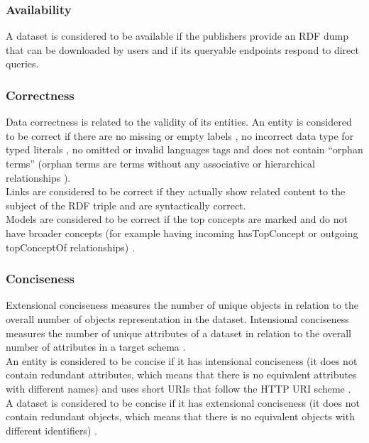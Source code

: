 \documentclass[onecolumn, crcready]{iosart2c}
\begin{document}
\subsubsection{Availability}

A dataset is considered to be available if the publishers provide an RDF dump that can be downloaded by users \cite{flemming2010}\cite{Hogan2010} and if its queryable endpoints respond to direct queries.

\subsubsection{Correctness}

Data correctness is related to the validity of its entities. An entity is considered to be correct if there are no missing or empty labels \cite{Acosta2013}\cite{Mader2012}, no incorrect data type for typed literals \cite{Hogan2010}\cite{Acosta2013}, no omitted or invalid languages tags \cite{Suominen:2012:IQS:2413941.2413985}\cite{Mader2012} and does not contain ``orphan terms'' (orphan terms are terms without any associative or hierarchical relationships \cite{journals/ires/Living10}).\\ Links are considered to be correct if they actually show related content to the subject of the RDF triple \cite{Suominen:2012:IQS:2413941.2413985}\cite{Acosta2013} and are syntactically correct. \\ Models are considered to be correct if the top concepts are marked and do not have broader concepts (for example having incoming hasTopConcept or outgoing topConceptOf relationships) \cite{Mader2012}.

\subsubsection{Conciseness}

Extensional conciseness measures the number of unique objects in relation to the overall number of objects representation in the dataset. Intensional conciseness measures the number of unique attributes of a dataset in relation to the overall number of attributes in a target schema \cite{ Bleiholder:2009}. \\ An entity is considered to be concise if it has intensional conciseness (it does not contain redundant attributes, which means that there is no equivalent attributes with different names) \cite{Mendes2012} and uses short URIs \cite{Framework2012} that follow the HTTP URI scheme \cite{Hogan:2012:ESL:2263498.2264570}\cite{Suominen2013}.\\ A dataset is considered to be concise if it has extensional conciseness (it does not contain redundant objects, which means that there is no equivalent objects with different identifiers) \cite{Mendes2012}.
\end{document}
